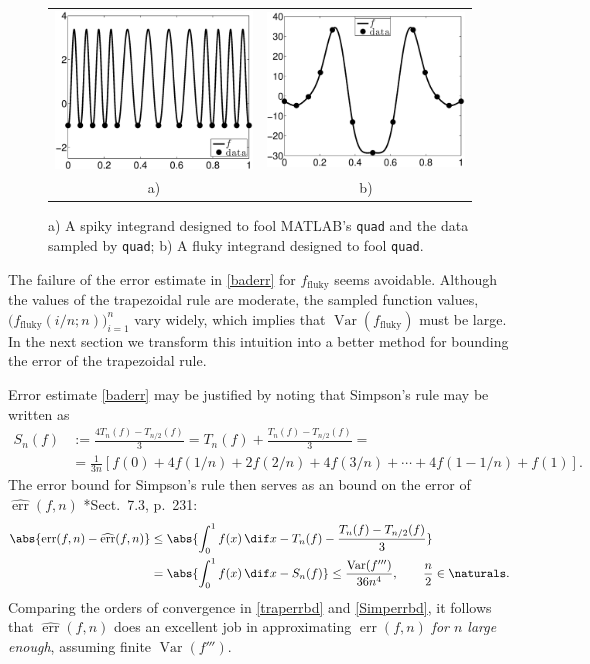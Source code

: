 \documentclass[]{article}
\DeclareMathOperator{\Var}{Var}
\DeclareMathOperator{\err}{err}
\newcommand{\herr}{\widehat{\err}}
\theoremstyle{definition}
\theoremstyle{remark}
\begin{document}
\begin{figure}
\centering 
\begin{tabular}{cc}
\includegraphics[width=5.5cm]{ExpositoryPaperSpikyquad.eps}
&
\includegraphics[width=5.5cm]{ExpositoryPaperFlukyquad.eps} \\
a) & b)
\end{tabular}
\caption{a) A spiky integrand designed to fool MATLAB's {\tt quad} and the data sampled by {\tt quad}; b) A fluky integrand designed to fool {\tt quad}. \label{fig:foolquad}}
\end{figure}

The failure of the error estimate in \eqref{baderr} for $f_{\text{fluky}}$ seems avoidable. Although the values of the trapezoidal rule are moderate, the sampled function values, $\bigl(f_{\text{fluky}}(i/n;n)\bigr)_{i=1}^{n}$ vary widely, which implies that $\Var(f_{\text{fluky}})$ must be large.  In the next section we transform this intuition into a better method for bounding the error of the trapezoidal rule.




Error estimate \eqref{baderr} may be justified by noting that Simpson's rule may be written as 
\begin{align*}
S_n(f) &:= \frac{4T_n(f) - T_{n/2}(f)}{3} =  T_n(f) + \frac{T_n(f) - T_{n/2}(f)}{3}= \\
& = \frac{1}{3n} \left [ f(0) + 4 f(1/n) + 2 f(2/n) + 4 f(3/n) + \cdots + 4 f(1-1/n) + f(1) \right].
\end{align*}
The error bound for Simpson's rule then serves as an bound on the error of $\herr(f,n)$ \cite{BraPet11a}*{Sect.\ 7.3, p.\ 231}:
\begin{align} \label{Simperrbd}
\abs{\err(f,n) - \herr(f,n)} & \le \abs{\int_0^1 f(x) \, \dif x - T_n(f) - \frac{T_n(f) - T_{n/2}(f)}{3}} \\
\nonumber
& = \abs{\int_0^1 f(x) \, \dif x - S_n(f)}  \le \frac{\Var(f''')}{36n^4}, \qquad \frac{n}2 \in \naturals. 
\end{align}
Comparing the orders of convergence in \eqref{traperrbd} and \eqref{Simperrbd}, it follows that $\herr(f,n)$ does an excellent job in approximating $\err(f,n)$ \emph{for $n$ large enough}, assuming finite $\Var(f''')$.
\end{document}
